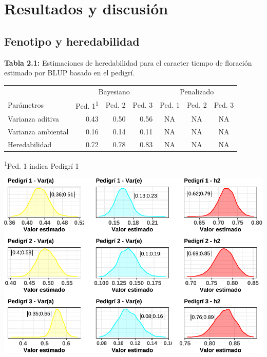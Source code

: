 \documentclass[11pt,spanish,a4paper,oneside,]{book} %
\begin{document}
\hypertarget{resultados-y-discusiuxf3n}{%
\chapter{Resultados y discusión}\label{resultados-y-discusiuxf3n}}

\hypertarget{results3}{%
\section{Fenotipo y heredabilidad}\label{results3}}

\begin{center}
\textbf{Tabla 2.1:} Estimaciones de heredabilidad para el caracter tiempo de floración estimado por BLUP basado en el pedigrí.

\end{center}

\captionsetup[table]{labelformat=empty,skip=1pt}
\begin{longtable}{lrrrccc}
\toprule
 & \multicolumn{3}{c}{Bayesiano} & \multicolumn{3}{c}{Penalizado} \\ 
 \cmidrule(lr){2-4} \cmidrule(lr){5-7}
Parámetros & Ped. 1\textsuperscript{1} & Ped. 2 & Ped. 3 & Ped. 1 & Ped. 2 & Ped. 3 \\ 
\midrule
Varianza aditiva & 0.43 & 0.50 & 0.56 & NA & NA & NA \\ 
Varianza ambiental & 0.16 & 0.14 & 0.11 & NA & NA & NA \\ 
Heredabilidad & 0.72 & 0.78 & 0.83 & NA & NA & NA \\ 
 \bottomrule
\end{longtable}
\vspace{-5mm}
\begin{minipage}{\linewidth}
\textsuperscript{1}Ped. 1 indica Pedigrí 1 \\ 
\end{minipage}

\begin{center}\includegraphics[width=1\linewidth]{figures/covar_h2} \end{center}
\end{document}
